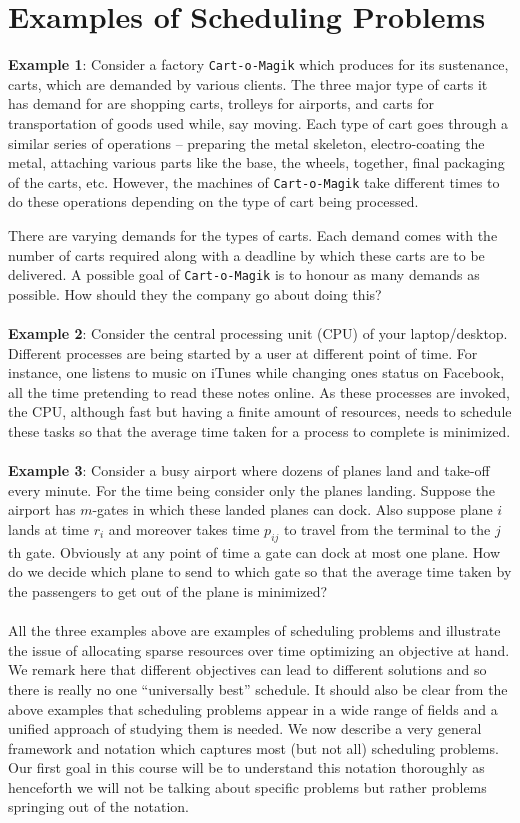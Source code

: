 \documentclass[11pt]{article}
\def\ni{\noindent}
\begin{document}
\MakeScribeTop

\section{Examples of Scheduling Problems}\label{sec:example}
\ni
{\bf Example 1}: Consider a factory {\tt Cart-o-Magik} which produces for its sustenance, carts, which are 
demanded by various clients. The three major type of carts it has demand for are shopping carts, 
trolleys for airports, and carts for transportation of goods used while, say moving. Each type of cart goes through a 
similar series of operations -- preparing the metal skeleton, electro-coating the metal, attaching various parts like the base, the wheels, together, final packaging of the carts, etc. However, the machines of {\tt Cart-o-Magik} take different 
times to do these operations depending on the type of cart being processed. 

There are varying demands for the types of carts. Each demand comes with the number of carts required along with a deadline by which these carts are to be delivered. A possible goal of {\tt Cart-o-Magik} is to honour as many demands as possible. How should they the company go about doing this? \\
\\
\ni
{\bf Example 2}: Consider the central processing unit (CPU) of your laptop/desktop. Different processes are being started by a user at different point of time. For instance, one listens to music on iTunes while changing ones status on Facebook, all the time pretending to read these notes online. As these processes are invoked, the CPU, although fast but having a finite amount of resources, needs to schedule these tasks so that the average time taken for a process to complete is minimized. \\
\\
\ni
{\bf Example 3}: Consider a busy airport where dozens of planes land and take-off every minute. For the time being consider only the planes landing. Suppose the airport has $m$-gates in which these landed planes can dock. Also suppose plane $i$ lands at time $r_i$ and moreover takes time $p_{ij}$ to travel from the terminal to the $j$th gate. Obviously at any point of time a gate can dock at most one plane. How do we decide which plane to send to which gate so that the average time taken by the passengers to get out of the plane is minimized? \\
\\
\ni
All the three examples above are examples of scheduling problems and illustrate the issue of allocating sparse resources over time optimizing an objective at hand. We remark here that different objectives can lead to different solutions and so there is really no one ``universally best'' schedule. It should also be clear from the above examples that scheduling problems appear in a wide range of fields and a unified approach of studying them is needed. We now describe a very general framework and notation which captures most (but not all) scheduling problems. Our first goal in this course will be to understand this notation thoroughly as henceforth we will not be talking about specific problems but rather problems springing out of the notation. 
\end{document}
